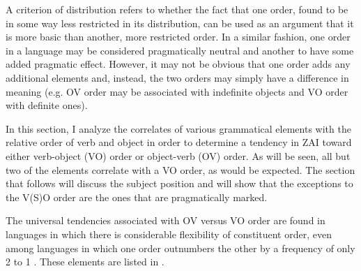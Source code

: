 A criterion of distribution refers to whether the fact that one order, found to be in some way less restricted in its distribution, can be used as an argument that it is more basic than another, more restricted order. In a similar fashion, one order in a language may be considered pragmatically neutral and another to have some added pragmatic effect. However, it may not be obvious that one order adds any additional elements and, instead, the two orders may simply have a difference in meaning (e.g. OV order may be associated with indefinite objects and VO order with definite ones). 


In this section, I analyze the correlates of various grammatical elements with the relative order of verb and object in order to determine a tendency in ZAI toward either verb-object (VO) order or object-verb (OV) order. As will be seen, all but two of the elements correlate with a VO order, as would be expected. The section that follows will discuss the subject position and will show that the exceptions to the V(S)O order are the ones that are pragmatically marked.

The universal tendencies associated with OV versus VO order are found in languages in which there is considerable flexibility of constituent order, even among languages in which one order outnumbers the other by a frequency of only 2 to 1 \citep{dryer2007}. These elements are listed in .


